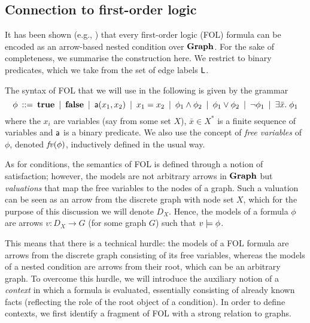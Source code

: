 \subsection{Connection to first-order logic}

It has been shown (e.g., \cite{Rensink-FOL,Habel-FOL}) that every first-order logic (FOL) formula can be encoded as an arrow-based nested condition over $\textbf{Graph}$. For the sake of completeness, we summarise the construction here. We restrict to binary predicates, which we take from the set of edge labels $\mathsf{L}$.

The syntax of FOL that we will use in the following is given by the grammar
%
\[ \phi \:::=\: \textbf{true}
        \:\mid\: \textbf{false}
		\:\mid\: \mathsf{a}(x_1,x_2)
        \:\mid\: x_1=x_2
		\:\mid\: \phi_1\wedge \phi_2
		\:\mid\: \phi_1\vee \phi_2
		\:\mid\: \neg\phi_1
		\:\mid\: \exists \bar x.\; \phi_1 
		\]
where the $x_i$ are variables (say from some set $X$), $\bar x\in X^*$ is a finite sequence of variables and $\mathsf{a}$ is a binary predicate. We also use the concept of \emph{free variables} of $\phi$, denoted $\mathit{fv}(\phi)$, inductively defined in the usual way.

\iffull
As for conditions, the semantics of FOL is defined through a notion of satisfaction; however, the models are not arbitrary arrows in $\textbf{Graph}$ but \emph{valuations} that map the free variables to the nodes of a graph. Such a valuation can be seen as an arrow from the discrete graph with node set $X$, which for the purpose of this discussion we will denote $D_X$. Hence, the models of a formula $\phi$ are arrows $v:D_X\to G$ (for some graph $G$) such that $v\models\phi$.

This means that there is a technical hurdle: the models of a FOL formula are arrows from the discrete graph consisting of its free variables, whereas the models of a nested condition are arrows from their root, which can be an arbitrary graph. To overcome this hurdle, we will introduce the auxiliary notion of a \emph{context} in which a formula is evaluated, essentially consisting of already known facts (reflecting the role of the root object of a condition). In order to define contexts, we first identify a fragment of FOL with a strong relation to graphs.

